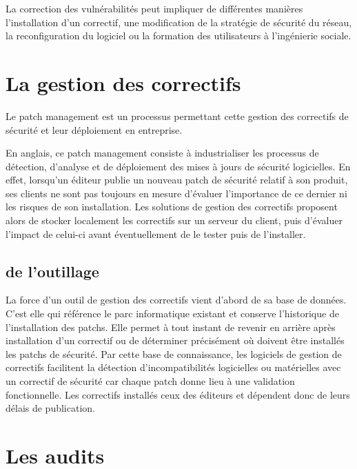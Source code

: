 La correction des vulnérabilités peut impliquer de différentes manières l’installation d’un correctif, une modification de la stratégie de sécurité du réseau, la reconfiguration du logiciel ou la formation des utilisateurs à l’ingénierie sociale.


\section{La gestion des correctifs}

Le patch management est un processus permettant cette gestion des correctifs de sécurité et leur déploiement en entreprise.


En anglais, ce patch management consiste à industrialiser les processus de détection, d'analyse et de déploiement des mises à jours de sécurité logicielles. En effet, lorsqu'un éditeur publie un nouveau patch de sécurité relatif à son produit, ses clients ne sont pas toujours en mesure d'évaluer l'importance de ce dernier ni les risques de son installation. Les solutions de gestion des correctifs proposent alors de stocker localement les correctifs sur un serveur du client, puis d'évaluer l'impact de celui-ci avant éventuellement de le tester puis de l'installer.

\subsection{de l'outillage}


La force d'un outil de gestion des correctifs vient d'abord de sa base de données. C'est elle qui référence le parc informatique existant et conserve l'historique de l'installation des patchs. Elle permet à tout instant de revenir en arrière après installation d'un correctif ou de déterminer précisément où doivent être installés les patchs de sécurité.
Par cette base de connaissance, les logiciels de gestion de correctifs facilitent la détection d'incompatibilités logicielles ou matérielles avec un correctif de sécurité car chaque patch donne lieu à une validation fonctionnelle. Les correctifs installés ceux des éditeurs et dépendent donc de leurs délais de publication.

\section{Les audits}

